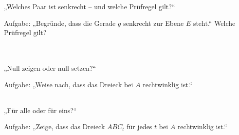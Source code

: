 \setcounter{aufgabe}{8}

\begin{aufgabe}{„Welches Paar ist senkrecht – und welche Prüfregel gilt?“}
\begin{teile}
\teil Aufgabe: „Begründe, dass die Gerade $g$ senkrecht zur Ebene $E$ steht.“ Welche Prüfregel gilt? \\  \\  \\ 
\end{teile}
\end{aufgabe}

\begin{aufgabe}{„Null zeigen oder null setzen?“}
\begin{teile}
\teil Aufgabe: „Weise nach, dass das Dreieck bei $A$ rechtwinklig ist.“ \\  \\ 
\end{teile}
\end{aufgabe}

\begin{aufgabe}{„Für alle oder für eins?“}
\begin{teile}
\teil Aufgabe: „Zeige, dass das Dreieck $ABC_t$ für jedes $t$ bei $A$ rechtwinklig ist.“ \\  \\ 
\end{teile}
\end{aufgabe}

